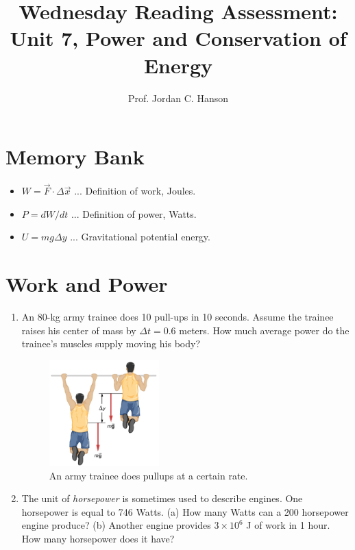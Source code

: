 \documentclass{article}
\begin{document}
\title{Wednesday Reading Assessment: Unit 7, Power and Conservation of Energy}
\author{Prof. Jordan C. Hanson}

\maketitle

\section{Memory Bank}

\begin{itemize}
\item $W = \vec{F} \cdot \Delta \vec{x}$ ... Definition of work, Joules.
\item $P = dW/dt$ ... Definition of power, Watts.
\item $U = mg\Delta y$ ... Gravitational potential energy.
\end{itemize}

\section{Work and Power}

\begin{enumerate}
\item An 80-kg army trainee does 10 pull-ups in 10 seconds.  Assume the trainee raises his center of mass by $\Delta t = 0.6$ meters.  How much average power do the trainee’s muscles supply moving his body?
\begin{figure}[ht]
\centering
\includegraphics[width=0.4\textwidth]{pullup.png}
\caption{\label{fig:work} An army trainee does pullups at a certain rate.}
\end{figure}
\item The unit of \textit{horsepower} is sometimes used to describe engines.  One horsepower is equal to 746 Watts.  (a) How many Watts can a 200 horsepower engine produce? (b) Another engine provides $3\times 10^6$ J of work in 1 hour.  How many horsepower does it have?
\end{enumerate}
\end{document}
